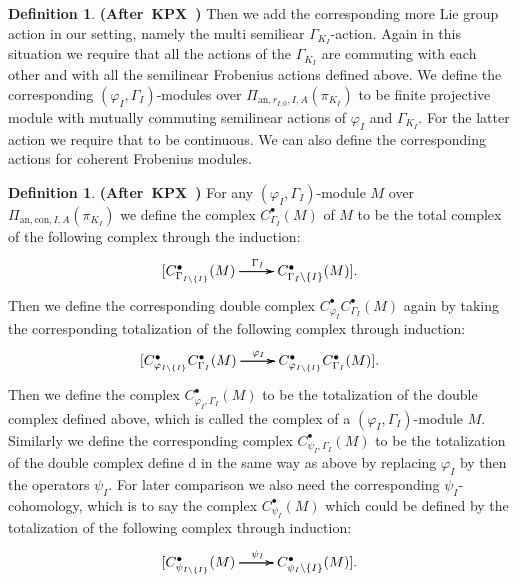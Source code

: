 \documentclass[12pt]{amsart}
\theoremstyle{definition}
\newtheorem{definition}[theorem]{Definition}
\numberwithin{equation}{section}
\newtheorem{assumption}[theorem]{Assumption}
\begin{document}
\begin{definition} \mbox{\bf{(After KPX \cite[Definition 2.2.12]{KPX})}}
Then we add the corresponding more Lie group action in our setting, namely the multi semiliear $\Gamma_{K_I}$-action. Again in this situation we require that all the actions of the $\Gamma_{K_I}$ are commuting with each other and with all the semilinear Frobenius actions defined above. We define the corresponding $(\varphi_I,\Gamma_I)$-modules over $\Pi_{\mathrm{an},r_{I,0},I,A}(\pi_{K_I})$ to be finite projective module with mutually commuting semilinear actions of $\varphi_I$ and $\Gamma_{K_I}$. For the latter action we require that to be continuous. We can also define the corresponding actions for coherent Frobenius modules.
\end{definition}






\begin{definition} \mbox{\bf{(After KPX \cite[2.3]{KPX})}}
For any $(\varphi_I,\Gamma_I)$-module $M$ over $\Pi_{\mathrm{an},\mathrm{con},I,A}(\pi_{K_I})$ we define the complex $C^\bullet_{\Gamma_I}(M)$ of $M$ to be the total complex of the following complex through the induction:
\[
\xymatrix@R+0pc@C+0pc{
[ C^\bullet_{\Gamma_{I\backslash\{I\}}}(M) \ar[r]^{\Gamma_I} \ar[r] \ar[r]  & C^\bullet_{\Gamma_I\backslash\{I\}}(M)]
.}
\]
Then we define the corresponding double complex $C^\bullet_{\varphi_I}C^\bullet_{\Gamma_I}(M)$ again by taking the corresponding totalization of the following complex through induction:
\[
\xymatrix@R+0pc@C+0pc{
[C^\bullet_{\varphi_{I\backslash\{I\}}}C^\bullet_{\Gamma_{I}}(M) \ar[r]^{\varphi_I} \ar[r] \ar[r]  & C^\bullet_{\varphi_{I\backslash\{I\}}}C^\bullet_{\Gamma_I}(M)]
.}
\]
Then we define the complex $C^\bullet_{\varphi_I,\Gamma_I}(M)$ to be the totalization of the double complex defined above, which is called the complex of a $(\varphi_I,\Gamma_I)$-module $M$. Similarly we define the corresponding complex $C^\bullet_{\psi_I,\Gamma_I}(M)$ to be the totalization of the double complex define  d in the same way as above by replacing $\varphi_I$ by then the operators $\psi_I$. For later comparison we also need the corresponding $\psi_I$-cohomology, which is to say the complex $C^\bullet_{\psi_I}(M)$ which could be defined by the totalization of the following complex through induction:
\[
\xymatrix@R+0pc@C+0pc{
[ C^\bullet_{\psi_{I\backslash\{I\}}}(M) \ar[r]^{\psi_I} \ar[r] \ar[r]  & C^\bullet_{\psi_I\backslash\{I\}}(M)]
.}
\]
\end{definition}
\end{document}
